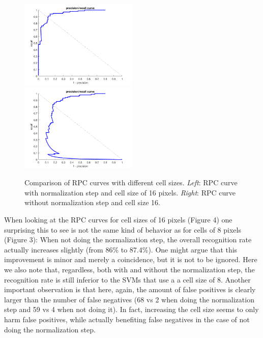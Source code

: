 \documentclass[12pt]{article}
\begin{document}
\begin{enumerate}[a)]
        \begin{figure}[h]			
        	\includegraphics[width=0.5\textwidth]{rpc_norm16}
        	\includegraphics[width=0.5\textwidth]{rpc_not_norm16}
        	\caption{Comparison of RPC curves with different cell sizes. \textit{Left}: RPC curve with normalization step and cell size of 16 pixels. \textit{Right}: RPC curve without normalization step and cell size 16. }
        \end{figure}
        
        When looking at the RPC curves for cell sizes of 16 pixels (Figure 4) one surprising this to see is not the same kind of behavior as for cells of 8 pixels (Figure 3): When not doing the normalization step, the overall recognition rate actually increases slightly (from 86\% to 87.4\%). One might argue that this improvement is minor and merely a coincidence, but it is not to be ignored. Here we also note that, regardless, both with and without the normalization step, the recognition rate is still inferior to the SVMs that use a a cell size of 8. Another important observation is that here, again, the amount of false positives is clearly larger than the number of false negatives (68 vs 2  when doing the normalization step and 59 vs 4 when not doing it). In fact, increasing the cell size seems to only harm false positives, while actually benefiting false negatives in the case of not doing the normalization step.
        
    

\end{enumerate}
\end{document}
